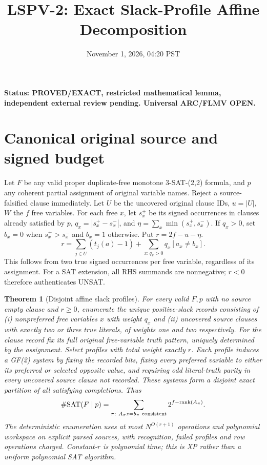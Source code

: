 \documentclass[11pt]{article}
\title{LSPV-2: Exact Slack-Profile Affine Decomposition}
\date{November 1, 2026, 04:20 PST}
\newtheorem{theorem}{Theorem}
\begin{document}
\maketitle
\noindent\textbf{Status: PROVED/EXACT, restricted mathematical lemma, independent external review pending. Universal ARC/FLMV OPEN.}
\section*{Canonical original source and signed budget}
Let $F$ be any valid proper duplicate-free monotone 3-SAT-(2,2) formula, and $p$ any coherent partial assignment of original variable names. Reject a source-falsified clause immediately. Let $U$ be the uncovered original clause IDs, $u=|U|$, $W$ the $f$ free variables. For each free $x$, let $s_x^\pm$ be its signed occurrences in clauses already satisfied by $p$, $q_x=|s_x^+-s_x^-|$, and $\eta=\sum_x\min(s_x^+,s_x^-)$. If $q_x>0$, set $b_x=0$ when $s_x^+>s_x^-$ and $b_x=1$ otherwise. Put $r=2f-u-\eta$.
\[
\boxed{r=\sum_{j\in U}(t_j(a)-1)+
\sum_{x:q_x>0}q_x[a_x\ne b_x].}\tag{1}
\]
This follows from two true signed occurrences per free variable, regardless of its assignment. For a SAT extension, all RHS summands are nonnegative; $r<0$ therefore authenticates UNSAT.
\begin{theorem}[Disjoint affine slack profiles]
For every valid $F,p$ with no source empty clause and $r\ge0$, enumerate the unique positive-slack records consisting of (i) nonpreferred free variables $x$ with weight $q_x$ and (ii) uncovered source clauses with exactly two or three true literals, of weights one and two respectively. For the clause record fix its full original free-variable truth pattern, uniquely determined by the assignment. Select profiles with total weight exactly $r$. Each profile induces a GF(2) system by fixing the recorded bits, fixing every preferred variable to either its preferred or selected opposite value, and requiring odd literal-truth parity in every uncovered source clause not recorded. These systems form a \emph{disjoint exact partition} of all satisfying completions. Thus
\[
\#\mathrm{SAT}(F\mid p)=
\sum_{\pi:\ A_\pi z=b_\pi\ {\rm consistent}}2^{f-\operatorname{rank}(A_\pi)}.
\]
The deterministic enumeration uses at most $N^{O(r+1)}$ operations and polynomial workspace on explicit parsed sources, with recognition, failed profiles and row operations charged. Constant-$r$ is polynomial time; this is XP rather than a uniform polynomial SAT algorithm.
\end{theorem}
\end{document}
